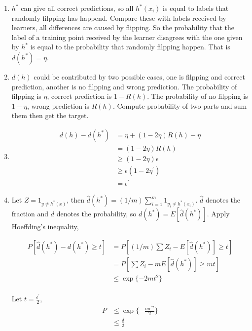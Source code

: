 \documentclass[12pt]{article}
\begin{document}
\begin{enumerate}[label=(\alph*), left=0pt] 
    \item 
    $h^{*}$ can give all correct predictions, so all $h^{*}(x_{i})$ is equal to labels that randomly
    filpping has happend. Compare these with labels received by learners, all differences are
    caused by flipping. So the probability that the label of a training point received by 
    the learner disagrees with the one given by $h^{*}$ is equal to the probability that 
    randomly filpping happen. That is $d(h^{*})=\eta$.

    \item 
    $d(h)$ could be contributed by two possible cases, one is filpping and correct prediction, 
    another is no filpping and wrong prediction. The probability of filpping is $\eta$, correct
    prediction is $1 - R(h)$. The probability of no filpping is $1 - \eta$, wrong prediction is 
    $R(h)$. Compute probability of two parts and sum them then get the target.

    \item 
    \begin{align*}
        d(h) - d(h ^{*}) &= \eta + (1 - 2 \eta) R(h) - \eta \\
        &= (1 - 2 \eta) R(h) \\
        &\ge (1 - 2 \eta) \epsilon \\ 
        &\ge \epsilon (1 - 2 \eta ^{'}) \\ 
        &= \epsilon ^{'}
    \end{align*}

    \item 
    Let $Z = 1 _{y \ne h ^{*}(x)}$, then $\hat{d}(h^{*}) = (1 / m) \sum_{i=1}^{m} 1 _{y_{i} \ne h
    ^{*} (x_{i})}$. $\hat{d}$ denotes the fraction and $d$ denotes the probability, so $d(h^{*}) = 
    E[\hat{d}(h^{*})]$. Apply Hoeffding's inequality, 

    \begin{align*}
        P[\hat{d}(h^{*}) - d(h^{*}) \ge t] &= P[(1 / m) \sum Z_{i} - E[\hat{d}(h^{*})] \ge t] \\
        &= P[\sum Z_{i} - m E[\hat{d}(h^{*})] \ge mt] \\
        &\le \exp \{-2m t^{2}\} \\
    \end{align*}
    
    Let $t = \frac{\epsilon^{'}}{2}$, 
    \begin{align*}
        P &\le \exp \{-\frac{m \epsilon^{'2}}{2}\} \\
        &\le \frac{\delta}{2} \\
    \end{align*}


\end{enumerate}
\end{document}

